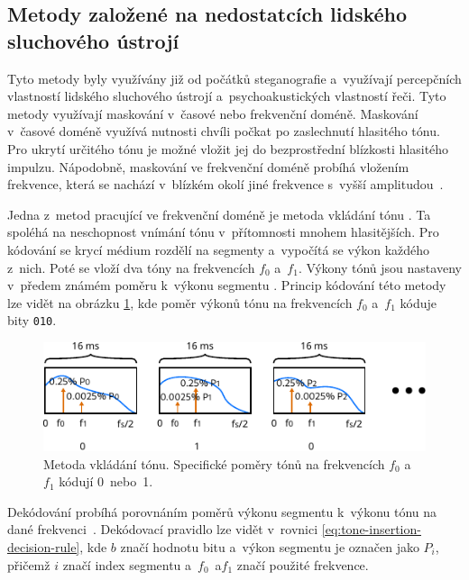 \subsection*{Metody založené na nedostatcích lidského sluchového ústrojí}
\label{sub:has}

Tyto metody byly využívány již od počátků steganografie a~využívají percepčních
vlastností lidského sluchového ústrojí a~psychoakustických vlastností řeči.
Tyto metody využívají maskování v~časové nebo frekvenční doméně. Maskování
v~časové doméně využívá nutnosti chvíli počkat po zaslechnutí hlasitého tónu.
Pro ukrytí určitého tónu je možné vložit jej do bezprostřední blízkosti
hlasitého impulzu. Nápodobně, maskování ve frekvenční doméně probíhá vložením
frekvence, která se nachází v~blízkém okolí jiné frekvence s~vyšší
amplitudou~\cite{Dutta2020}.

Jedna z~metod pracující ve frekvenční doméně je metoda vkládání tónu
\cite{Dutta2020}. Ta spoléhá na neschopnost vnímání tónu v~přítomnosti mnohem
hlasitějších. Pro kódování se krycí médium rozdělí na segmenty a~vypočítá se
výkon každého z~nich. Poté se vloží dva tóny na frekvencích $f_0$ a~$f_1$.
Výkony tónů jsou nastaveny v~předem známém poměru k~výkonu segmentu
\cite{Djebbar2012}. Princip kódování této metody lze vidět na obrázku
\ref{pic:tone-insertion}, kde poměr výkonů tónu na frekvencích $f_0$ a~$f_1$
kóduje bity \texttt{010}.

\begin{figure}[hbt]
    \centering
    \includegraphics[width=\textwidth]{obrazky/tone-insertion-diagram.pdf}
    \caption{Metoda vkládání tónu. Specifické poměry tónů na frekvencích $f_0$
    a~$f_1$ kódují 0~nebo~1.}
    \label{pic:tone-insertion}
\end{figure}

Dekódování probíhá porovnáním poměrů výkonu segmentu k~výkonu tónu na dané
frekvenci~\cite{Djebbar2012}. Dekódovací pravidlo lze vidět v~rovnici
\ref{eq:tone-insertion-decision-rule}, kde $b$ značí hodnotu bitu a~výkon
segmentu je označen jako $P_i$, přičemž $i$ značí index segmentu a~$f_0$~a$f_1$
značí použité frekvence.

